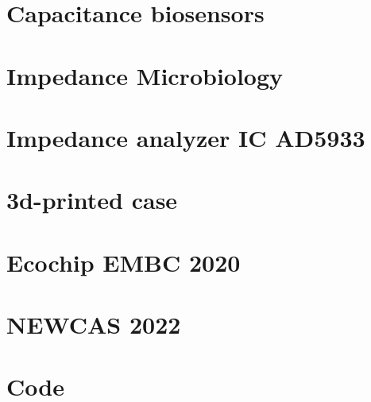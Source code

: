 \documentclass{ucetd}
\begin{document}
\chapter{Capacitance biosensors}
\label{app:CapacitanceBiosensors}

\chapter{Impedance Microbiology}

\chapter{Impedance analyzer IC AD5933}

\chapter{3d-printed case}

\chapter{Ecochip EMBC 2020}
\label{app:Ecochip}

\chapter{NEWCAS 2022}

\chapter{Code}

\end{document}
